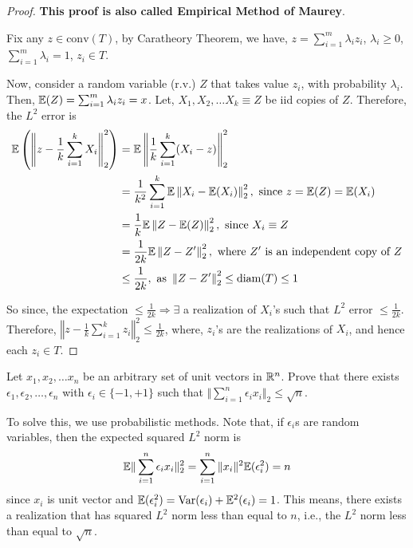 \documentclass[12pt]{article}
\begin{document}
\begin{proof}
    \textbf{This proof is also called Empirical Method of Maurey}.

    Fix any $z \in \text{conv}(T)$, by Caratheory Theorem, we have, $z = \sum_{i=1}^m \lambda_i z_i$, $\lambda_i \geq 0$, $\sum_{i=1}^m \lambda_i = 1$, $z_i \in T$.

    Now, consider a random variable (r.v.) $Z$ that takes value $z_i$, with probability $\lambda_i$. Then, $\mathbb{E}(Z) = \sum_{i=1}^m \lambda_i z_i = x$. Let, $X_1, X_2, \dots X_k \equiv Z$ be iid copies of $Z$. Therefore, the $L^2$ error is
    \begin{align*}
        \mathbb{E}\left(\left\Vert z - \frac{1}{k} \sum_{i=1}^k X_i\right\Vert_2^2\right)
         & = \mathbb{E}\left\Vert \frac{1}{k} \sum_{i=1}^k (X_i - z)\right\Vert_2^2                                           \\
         & = \frac{1}{k^2} \sum_{i=1}^k \mathbb{E}\left\Vert X_i - \mathbb{E}(X_i)\right\Vert_2^2, \text{ since } z = \mathbb{E}(Z) = \mathbb{E}(X_i) \\
         & = \frac{1}{k} \mathbb{E}\left\Vert Z - \mathbb{E}(Z)\right\Vert_2^2, \text{ since } X_i \equiv Z                           \\
         & = \frac{1}{2k} \mathbb{E}\left\Vert Z - Z'\right\Vert_2^2, \text{ where } Z' \text{ is an independent copy of } Z  \\
         & \leq \frac{1}{2k}, \text{ as } \left\Vert Z-Z'\right\Vert_2^2 \leq \text{diam}(T) \leq 1
    \end{align*}

    \noindent So since, the expectation $\leq \frac{1}{2k} \Rightarrow \exists$ a realization of $X_i$'s such that $L^2$ error $\leq \frac{1}{2k}$. Therefore, $\left\Vert z - \frac{1}{k} \sum_{i=1}^k z_i\right\Vert_2^2 \leq \frac{1}{2k}$, where, $z_i$'s are the realizations of $X_i$, and hence each $z_i \in T$.
\end{proof}

\begin{exercisebox}
    Let $x_1, x_2, \dots x_n$ be an arbitrary set of unit vectors in $\mathbb{R}^n$. Prove that there exists $\epsilon_1, \epsilon_2, \dots, \epsilon_n$ with $\epsilon_i \in \{-1, +1\}$ such that $\Vert \sum_{i=1}^n \epsilon_i x_i\Vert_2 \leq \sqrt{n}$.

    To solve this, we use probabilistic methods. Note that, if $\epsilon_i$s are random variables, then the expected squared $L^2$ norm is
    \begin{equation*}
        \mathbb{E}\Vert \sum_{i=1}^n \epsilon_i x_i\Vert_2^2 = \sum_{i=1}^n \Vert x_i\Vert^2 \mathbb{E}(\epsilon_i^2) = n
    \end{equation*}
    \noindent since $x_i$ is unit vector and $\mathbb{E}(\epsilon_i^2) = \mathrm{Var}(\epsilon_i) + \mathbb{E}^2(\epsilon_i) = 1$. This means, there exists a realization that has squared $L^2$ norm less than equal to $n$, i.e., the $L^2$ norm less than equal to $\sqrt{n}$.
\end{exercisebox}
\end{document}
